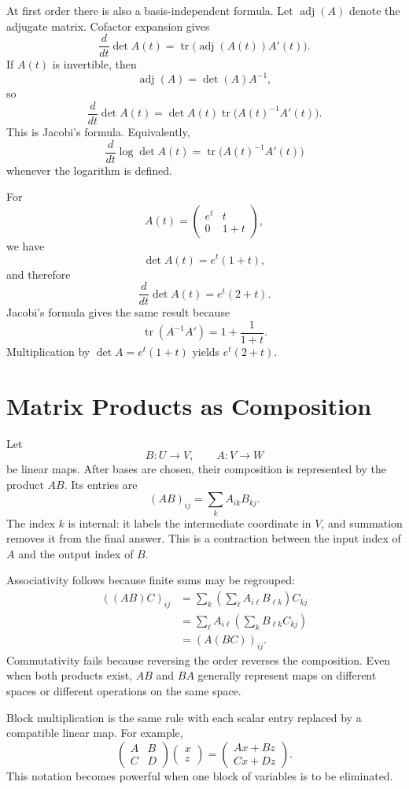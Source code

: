 At first order there is also a basis-independent formula.  Let \(\operatorname{adj}(A)\) denote the adjugate matrix.  Cofactor expansion gives
\[
  \frac{d}{dt}\det A(t)
  =\operatorname{tr}\bigl(\operatorname{adj}(A(t))A'(t)\bigr).
\]
If \(A(t)\) is invertible, then
\[
  \operatorname{adj}(A)=\det(A)A^{-1},
\]
so
\[
  \boxed{
  \frac{d}{dt}\det A(t)
  =\det A(t)\operatorname{tr}\bigl(A(t)^{-1}A'(t)\bigr).}
\]
This is Jacobi's formula.  Equivalently,
\[
  \frac{d}{dt}\log\det A(t)
  =\operatorname{tr}\bigl(A(t)^{-1}A'(t)\bigr)
\]
whenever the logarithm is defined.

For
\[
  A(t)=
  \begin{pmatrix}
    e^t&t\\
    0&1+t
  \end{pmatrix},
\]
we have
\[
  \det A(t)=e^t(1+t),
\]
and therefore
\[
  \frac{d}{dt}\det A(t)=e^t(2+t).
\]
Jacobi's formula gives the same result because
\[
  \operatorname{tr}(A^{-1}A')=1+\frac1{1+t}.
\]
Multiplication by \(\det A=e^t(1+t)\) yields \(e^t(2+t)\).

\section{Matrix Products as Composition}

Let
\[
  B:U\to V,
  \qquad
  A:V\to W
\]
be linear maps.  After bases are chosen, their composition is represented by the product \(AB\).  Its entries are
\[
  (AB)_{ij}=\sum_k A_{ik}B_{kj}.
\]
The index \(k\) is internal: it labels the intermediate coordinate in \(V\), and summation removes it from the final answer.  This is a contraction between the input index of \(A\) and the output index of \(B\).

Associativity follows because finite sums may be regrouped:
\[
\begin{aligned}
((AB)C)_{ij}
&=\sum_{k}\left(\sum_{\ell}A_{i\ell}B_{\ell k}\right)C_{kj}\\
&=\sum_{\ell}A_{i\ell}\left(\sum_k B_{\ell k}C_{kj}\right)\\
&=(A(BC))_{ij}.
\end{aligned}
\]
Commutativity fails because reversing the order reverses the composition.  Even when both products exist, \(AB\) and \(BA\) generally represent maps on different spaces or different operations on the same space.

Block multiplication is the same rule with each scalar entry replaced by a compatible linear map.  For example,
\[
\begin{pmatrix}A&B\\C&D\end{pmatrix}
\begin{pmatrix}x\\z\end{pmatrix}
=
\begin{pmatrix}Ax+Bz\\Cx+Dz\end{pmatrix}.
\]
This notation becomes powerful when one block of variables is to be eliminated.

